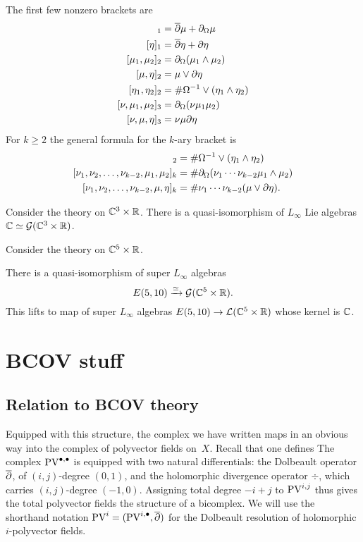 \documentclass[11pt]{amsart}
\begin{document}
The first few nonzero brackets are
\begin{align*}
[\mu]_1 & = \dbar \mu + \div \mu \\
[\eta]_1 & = \dbar \eta + \del \eta \\ 
[\mu_1,\mu_2]_2 & = \div (\mu_1 \wedge \mu_2) \\
[\mu, \eta]_2 & = \mu \vee \del \eta \\
[\eta_1,\eta_2]_2 & = \# \Omega^{-1} \vee (\eta_1 \wedge \eta_2)  \\
[\nu, \mu_1,\mu_2]_3 & = \div(\nu \mu_1 \mu_2) \\
[\nu, \mu,\eta]_3 & = \nu \mu \del \eta
\end{align*}
For $k \geq 2$ the general formula for the $k$-ary bracket is 
\begin{align*}
[\eta_1,\eta_2]_2 & = \# \Omega^{-1} \vee (\eta_1 \wedge \eta_2)  \\
[\nu_1,\nu_2, \ldots, \nu_{k-2}, \mu_1,\mu_2]_{k} & = \# \div(\nu_1 \cdots \nu_{k-2} \mu_1 \wedge \mu_2) \\ 
[\nu_1,\nu_2, \ldots, \nu_{k-2}, \mu,\eta]_{k} & = \# \nu_1 \cdots \nu_{k-2} (\mu \vee \del \eta) .
\end{align*}

\parsec[]
Consider the theory on $\mathbb C^3 \times \mathbb R$. 
There is a quasi-isomorphism of $L_\infty$ Lie algebras $\mathbb C \simeq \mathcal G (\mathbb C^3 \times \mathbb R)$. 

\parsec[]
Consider the theory on $\mathbb C^5 \times \mathbb R$. 

\begin{prop}
There is a quasi-isomorphism of super $L_\infty$ algebras 
\[
E(5,10) \xrightarrow{\simeq} \mathcal G(\mathbb C^5 \times \mathbb R) .
\]
This lifts to map of super $L_\infty$ algebras $E(5,10) \to \mathcal L(\mathbb C^5 \times \mathbb R)$ whose kernel is $\mathbb C$.
\end{prop}


\section{BCOV stuff}

\subsection{Relation to BCOV theory}

\parsec[sec:pv] 
Equipped with this structure, the complex we have written maps in an obvious way into the complex of polyvector fields on~$X$. Recall that one defines
The complex ${\rm PV}^{\bullet,\bullet}$ is equipped with two natural differentials: the Dolbeault operator $\overline{\partial}$, of $(i,j)$-degree $(0,1)$, and the holomorphic divergence operator $\div$, which carries $(i,j)$-degree $(-1,0)$. Assigning total degree $- i + j$ to ${\rm PV}^{i,j}$ thus gives the total polyvector fields the structure of a bicomplex. We will use the shorthand notation ${\rm PV}^i = ({\rm PV}^{i,\bullet}, \overline{\partial} )$ for the Dolbeault resolution of holomorphic $i$-polyvector fields. 
\end{document}
